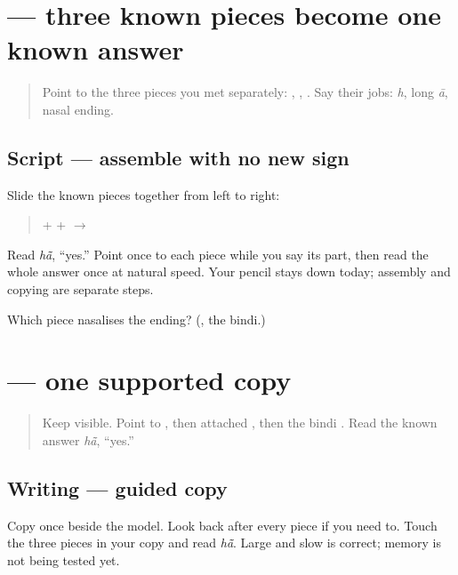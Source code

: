 \section[\texorpdfstring{\pa{ਹਾਂ} (hā̃)}{ਹਾਂ (hā̃)}]{ — three known pieces become one known answer}

\label{lesson:PA-W01-haan-assemble}



\begin{quote}
Point to the three pieces you met separately: \textbf{}, \textbf{}, \textbf{}. Say their jobs: \emph{h}, long \emph{ā}, nasal ending.
\end{quote}

\subsection*{Script — assemble with no new sign}
Slide the known pieces together from left to right:

\begin{quote}
\textbf{} + \textbf{} + \textbf{} $\to$ \textbf{}
\end{quote}

Read \emph{hā̃}, “yes.” Point once to each piece while you say its part, then read the whole answer once at natural speed. Your pencil stays down today; assembly and copying are separate steps.

\begin{tcolorbox}[breakable,colback=teal!4,colframe=teal!35!black,title={Before you move on}]
Which piece nasalises the ending? (\textbf{}, the bindi.)
\end{tcolorbox}
\section[\texorpdfstring{\pa{ਹਾਂ} (hā̃)}{ਹਾਂ (hā̃)}]{ — one supported copy}

\label{lesson:PA-W01-haan-guided-copy}



\begin{quote}
Keep \textbf{} visible. Point to \textbf{}, then attached \textbf{}, then the bindi \textbf{}. Read the known answer \emph{hā̃}, “yes.”
\end{quote}

\subsection*{Writing — guided copy}
Copy \textbf{} once beside the model. Look back after every piece if you need to. Touch the three pieces in your copy and read \emph{hā̃}. Large and slow is correct; memory is not being tested yet.

